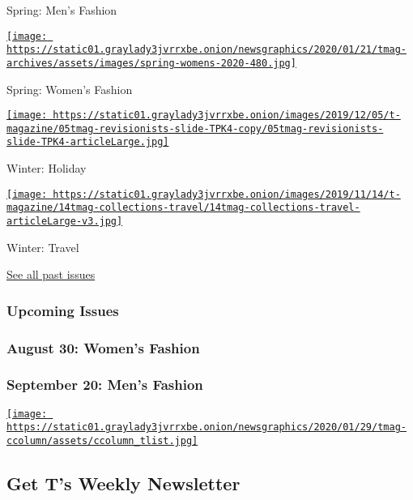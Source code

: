 Spring: Men's Fashion

\href{https://www.nytimes3xbfgragh.onion/issue/t-magazine/2020/02/06/ts-feb-23-womens-fashion-issue}{\texttt{[image: https://static01.graylady3jvrrxbe.onion/newsgraphics/2020/01/21/tmag-archives/assets/images/spring-womens-2020-480.jpg]}}

Spring: Women's Fashion

\href{https://www.nytimes3xbfgragh.onion/issue/t-magazine/2019/11/21/ts-dec-8-holiday-issue}{\texttt{[image: https://static01.graylady3jvrrxbe.onion/images/2019/12/05/t-magazine/05tmag-revisionists-slide-TPK4-copy/05tmag-revisionists-slide-TPK4-articleLarge.jpg]}}

Winter: Holiday

\href{https://www.nytimes3xbfgragh.onion/issue/t-magazine/2019/11/04/ts-nov-17-travel-issue}{\texttt{[image: https://static01.graylady3jvrrxbe.onion/images/2019/11/14/t-magazine/14tmag-collections-travel/14tmag-collections-travel-articleLarge-v3.jpg]}}

Winter: Travel

\href{https://www.nytimes3xbfgragh.onion/interactive/2020/t-magazine/past-issues.html}{See
all past issues}

\hypertarget{upcoming-issues}{%
\subsubsection{Upcoming Issues}\label{upcoming-issues}}

\hypertarget{august-30-womens-fashion}{%
\subsubsection{August 30: Women's
Fashion}\label{august-30-womens-fashion}}

\hypertarget{september-20-mens-fashion}{%
\subsubsection{September 20: Men's
Fashion}\label{september-20-mens-fashion}}

\href{https://www.nytimes3xbfgragh.onion/newsletters/t-list}{\texttt{[image: https://static01.graylady3jvrrxbe.onion/newsgraphics/2020/01/29/tmag-ccolumn/assets/ccolumn\_tlist.jpg]}}

\hypertarget{get-ts-weekly-newsletter}{%
\subsection{Get T's Weekly Newsletter}\label{get-ts-weekly-newsletter}}

